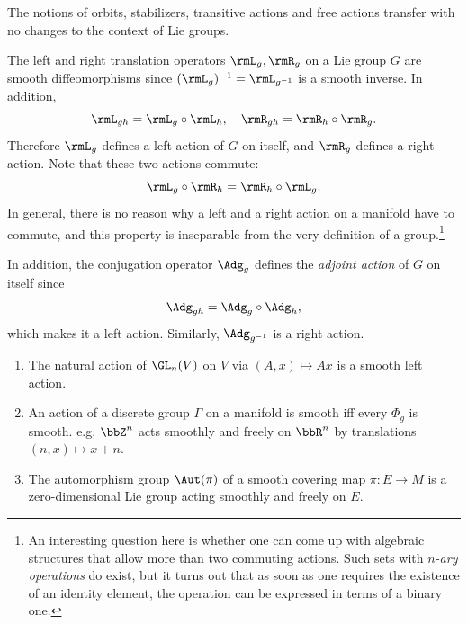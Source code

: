 The notions of orbits, stabilizers, transitive actions and free actions transfer with no changes to the context of Lie groups.

\begin{example}
    The left and right translation operators $\rmL_g,\rmR_g$ on a Lie group $G$ are smooth diffeomorphisms since $(\rmL_g)^{-1}=\rmL_{g^{-1}}$ is a smooth inverse. In addition,
    \[\rmL_{gh}=\rmL_g\circ \rmL_h,\quad \rmR_{gh}=\rmR_h\circ \rmR_g.\]
    Therefore $\rmL_g$ defines a left action of $G$ on itself, and $\rmR_g$ defines a right action. Note that these two actions commute: 
    \[\rmL_g\circ \rmR_h=\rmR_h\circ \rmL_g.\]
    In general, there is no reason why a left and a right action on a manifold have to commute, and this property is inseparable from the very definition of a group.\footnote{An interesting question here is whether one can come up with algebraic structures that allow more than two commuting actions. Such sets with \emph{$n$-ary operations} do exist, but it turns out that as soon as one requires the existence of an identity element, the operation can be expressed in terms of a binary one.}

    In addition, the conjugation operator $\Adg_g$ defines the \emph{adjoint action} of $G$ on itself since 
    \[\Adg_{gh}=\Adg_g\circ \Adg_h,\]
    which makes it a left action. Similarly, $\Adg_{g^{-1}}$ is a right action.
\end{example}

\begin{example}
    \begin{enumerate}[label=(\alph*)]
        \item The natural action of $\GL_n(V)$ on $V$ via $(A,x)\mapsto Ax$ is a smooth left action.
        \item An action of a discrete group $\varGamma$ on a manifold is smooth iff every $\Phi_g$ is smooth. e.g, $\bbZ^n$ acts smoothly and freely on $\bbR^n$ by translations $(n,x)\mapsto x+n$.
        \item The automorphism group $\Aut(\pi)$ of a smooth covering map $\pi:E\to M$ is a zero-dimensional Lie group acting smoothly and freely on $E$.
    \end{enumerate}
\end{example}

